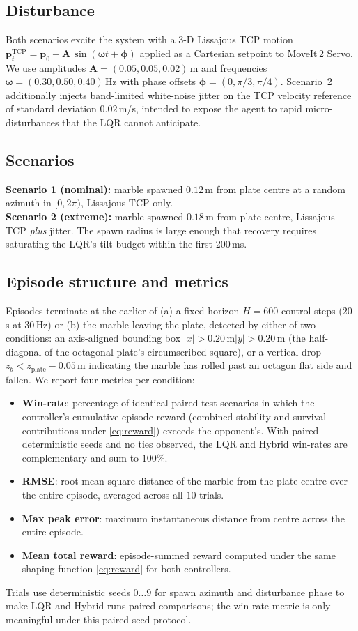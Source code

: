 \documentclass[conference]{IEEEtran}
\begin{document}
\subsection{Disturbance}
Both scenarios excite the system with a 3-D Lissajous TCP motion
$\bm{p}^{\text{TCP}}_t = \bm{p}_0 + \bm{A}\,\sin(\bm{\omega} t + \bm{\phi})$
applied as a Cartesian setpoint to MoveIt\,2 Servo. We use amplitudes
$\bm{A}=(0.05,0.05,0.02)\,$m and frequencies
$\bm{\omega}=(0.30,0.50,0.40)\,$Hz with phase offsets
$\bm{\phi}=(0,\pi/3,\pi/4)$. Scenario~2 additionally injects band-limited
white-noise jitter on the TCP velocity reference of standard deviation
$0.02\,$m/s, intended to expose the agent to rapid micro-disturbances that
the LQR cannot anticipate.

\subsection{Scenarios}
\textbf{Scenario 1 (nominal):} marble spawned $0.12\,$m from plate centre at
a random azimuth in $[0,2\pi)$, Lissajous TCP only.\\
\textbf{Scenario 2 (extreme):} marble spawned $0.18\,$m from plate centre,
Lissajous TCP \emph{plus} jitter. The spawn radius is large enough that
recovery requires saturating the LQR's tilt budget within the first
$200\,$ms.

\subsection{Episode structure and metrics}
Episodes terminate at the earlier of (a) a fixed horizon $H=600$ control
steps ($20\,$s at $30\,$Hz) or (b) the marble leaving the plate, detected
by either of two conditions: an axis-aligned bounding box
$|x|>0.20\,$m\;\;$|y|>0.20\,$m (the half-diagonal of the
octagonal plate's circumscribed square), or a vertical drop
$z_b < z_{\text{plate}} - 0.05\,$m indicating the marble has rolled past
an octagon flat side and fallen. We report four metrics per condition:
\begin{itemize}
  \item \textbf{Win-rate}: percentage of identical
        paired test scenarios in which the controller's cumulative
        episode reward (combined stability and survival contributions
        under \eqref{eq:reward}) exceeds the opponent's. With paired
        deterministic seeds and no ties observed, the LQR and Hybrid
        win-rates are complementary and sum to $100\%$.
  \item \textbf{RMSE}: root-mean-square distance of the marble from the
        plate centre over the entire episode, averaged across all $10$
        trials.
  \item \textbf{Max peak error}: maximum instantaneous distance from centre
        across the entire episode.
  \item \textbf{Mean total reward}: episode-summed reward computed under the
        same shaping function \eqref{eq:reward} for both controllers.
\end{itemize}
Trials use deterministic seeds $0\!\ldots\!9$ for spawn azimuth and
disturbance phase to make LQR and Hybrid runs paired comparisons; the
win-rate metric is only meaningful under this paired-seed protocol.
\end{document}
